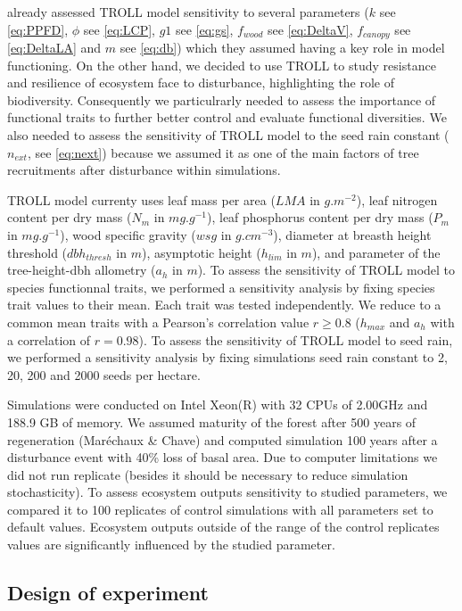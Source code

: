 \documentclass[12pt,]{article}
\theoremstyle{definition}
\theoremstyle{definition}
\theoremstyle{remark}
\begin{document}
\citet{Li} already assessed TROLL model sensitivity to several
parameters (\(k\) see \eqref{eq:PPFD}, \(\phi\) see \eqref{eq:LCP}, \(g1\)
see \eqref{eq:gs}, \(f_{wood}\) see \eqref{eq:DeltaV}, \(f_{canopy}\) see
\eqref{eq:DeltaLA} and \(m\) see \eqref{eq:db}) which they assumed having a
key role in model functioning. On the other hand, we decided to use
TROLL to study resistance and resilience of ecosystem face to
disturbance, highlighting the role of biodiversity. Consequently we
particulrarly needed to assess the importance of functional traits to
further better control and evaluate functional diversities. We also
needed to assess the sensitivity of TROLL model to the seed rain
constant (\(n_{ext}\), see \eqref{eq:next}) because we assumed it as one
of the main factors of tree recruitments after disturbance within
simulations.

TROLL model currenty uses leaf mass per area (\(LMA\) in \(g.m^{-2}\)),
leaf nitrogen content per dry mass (\(N_m\) in \(mg.g^{-1}\)), leaf
phosphorus content per dry mass (\(P_m\) in \(mg.g^{-1}\)), wood
specific gravity (\(wsg\) in \(g.cm^{-3}\)), diameter at breasth height
threshold (\(dbh_{thresh}\) in \(m\)), asymptotic height (\(h_{lim}\) in
\(m\)), and parameter of the tree-height-dbh allometry (\(a_h\) in
\(m\)). To assess the sensitivity of TROLL model to species functionnal
traits, we performed a sensitivity analysis by fixing species trait
values to their mean. Each trait was tested independently. We reduce to
a common mean traits with a Pearson's correlation value \(r \geq 0.8\)
(\(h_{max}\) and \(a_h\) with a correlation of \(r=0.98\)). To assess
the sensitivity of TROLL model to seed rain, we performed a sensitivity
analysis by fixing simulations seed rain constant to 2, 20, 200 and 2000
seeds per hectare.

Simulations were conducted on Intel Xeon(R) with 32 CPUs of 2.00GHz and
188.9 GB of memory. We assumed maturity of the forest after 500 years of
regeneration (Maréchaux \& Chave) and computed simulation 100 years
after a disturbance event with 40\% loss of basal area. Due to computer
limitations we did not run replicate (besides it should be necessary to
reduce simulation stochasticity). To assess ecosystem outputs
sensitivity to studied parameters, we compared it to 100 replicates of
control simulations with all parameters set to default values. Ecosystem
outputs outside of the range of the control replicates values are
significantly influenced by the studied parameter.

\subsection{Design of experiment}\label{design-of-experiment}
\end{document}
